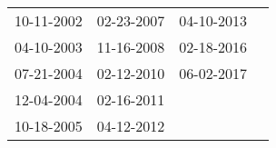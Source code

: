 \begin{supertabular}{llll}
 10-11-2002 &  02-23-2007 &  04-10-2013 \\
 04-10-2003 &  11-16-2008 &  02-18-2016 \\
 07-21-2004 &  02-12-2010 &  06-02-2017 \\
 12-04-2004 &  02-16-2011 &             \\
 10-18-2005 &  04-12-2012 &             \\
\end{supertabular}

